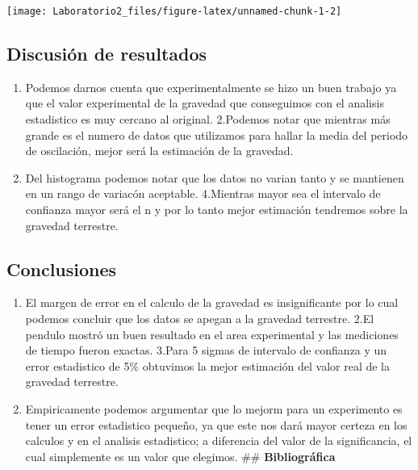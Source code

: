 \documentclass[
]{article}
\providecommand{\tightlist}{%
  \setlength{\itemsep}{0pt}\setlength{\parskip}{0pt}}
\begin{document}
\begin{center}\texttt{[image: Laboratorio2\_files/figure-latex/unnamed-chunk-1-2]} \end{center}

\subsection{\texorpdfstring{\textbf{Discusión de resultados
}}{Discusión de resultados }}\label{discusiuxf3n-de-resultados}

\begin{enumerate}
\def\labelenumi{\arabic{enumi}.}
\tightlist
\item
  Podemos darnos cuenta que experimentalmente se hizo un buen trabajo ya
  que el valor experimental de la gravedad que conseguimos con el
  analisis estadistico es muy cercano al original. 2.Podemos notar que
  mientras más grande es el numero de datos que utilizamos para hallar
  la media del periodo de oscilación, mejor será la estimación de la
  gravedad.
\item
  Del histograma podemos notar que los datos no varian tanto y se
  mantienen en un rango de variacón aceptable. 4.Mientras mayor sea el
  intervalo de confianza mayor será el n y por lo tanto mejor estimación
  tendremos sobre la gravedad terrestre.
\end{enumerate}

\subsection{\texorpdfstring{\textbf{Conclusiones
}}{Conclusiones }}\label{conclusiones}

\begin{enumerate}
\def\labelenumi{\arabic{enumi}.}
\tightlist
\item
  El margen de error en el calculo de la gravedad es insignificante por
  lo cual podemos concluir que los datos se apegan a la gravedad
  terrestre. 2.El pendulo mostró un buen resultado en el area
  experimental y las mediciones de tiempo fueron exactas. 3.Para 5
  sigmas de intervalo de confianza y un error estadistico de 5\%
  obtuvimos la mejor estimación del valor real de la gravedad terrestre.
\item
  Empiricamente podemos argumentar que lo mejorm para un experimento es
  tener un error estadistico pequeño, ya que este nos dará mayor certeza
  en los calculos y en el analisis estadistico; a diferencia del valor
  de la significancia, el cual simplemente es un valor que elegimos.
  \#\# \textbf{Bibliográfica }
\end{enumerate}
\end{document}
